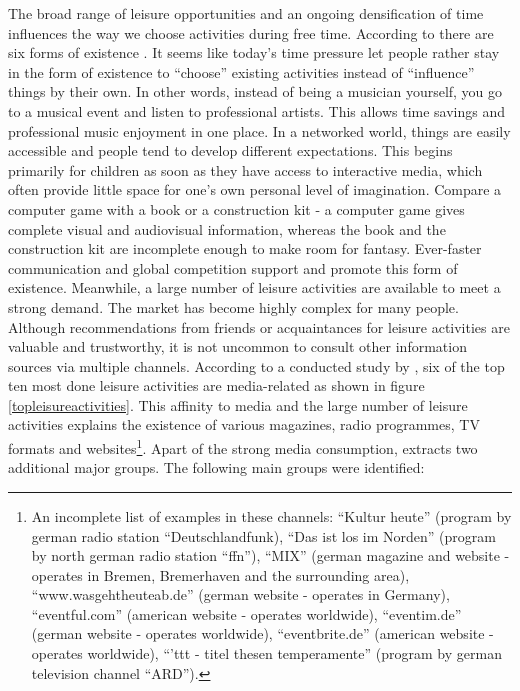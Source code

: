 \documentclass[12pt,numbers=noenddot,parskip,bibliography=totocnumbered,listof=totocnumbered,draft=true]{scrreprt}
\begin{document}
The broad range of leisure opportunities and an ongoing densification of time influences the way we choose activities during free time. According to \citeauthor{schulze2005} there are six forms of existence \citep[p.198-206]{schulze2005}. It seems like today's time pressure let people rather stay in the form of existence to ``choose'' existing activities instead of ``influence'' things by their own. In other words, instead of being a musician yourself, you go to a musical event and listen to professional artists. This allows time savings and professional music enjoyment in one place. In a networked world, things are easily accessible and people tend to develop different expectations. This begins primarily for children as soon as they have access to interactive media, which often provide little space for one's own personal level of imagination. Compare a computer game with a book or a construction kit - a computer game gives complete visual and audiovisual information, whereas the book and the construction kit are incomplete enough to make room for fantasy. Ever-faster communication and global competition support and promote this form of existence. Meanwhile, a large number of leisure activities are available to meet a strong demand. The market has become highly complex for many people. Although recommendations from friends or acquaintances for leisure activities are valuable and trustworthy, it is not uncommon to consult other information sources via multiple channels. According to a conducted study by \citeauthor{freizeitmonitor2016}, six of the top ten most done leisure activities are media-related as shown in figure \ref{topleisureactivities}. This affinity to media and the large number of leisure activities explains the existence of various magazines, radio programmes, TV formats and websites\footnote{An incomplete list of examples in these channels: ``Kultur heute'' (program by german radio station ``Deutschlandfunk), ``Das ist los im Norden'' (program by north german radio station ``ffn''), ``MIX'' (german magazine and website - operates in Bremen, Bremerhaven and the surrounding area), ``www.wasgehtheuteab.de'' (german website - operates in Germany), ``eventful.com'' (american website - operates worldwide), ``eventim.de'' (german website - operates worldwide), ``eventbrite.de'' (american website - operates worldwide), ``'ttt - titel thesen temperamente'' (program by german television channel ``ARD'').}. Apart of the strong media consumption, \citeauthor{freizeitmonitor2016} extracts two additional major groups. The following main groups were identified:
\end{document}
